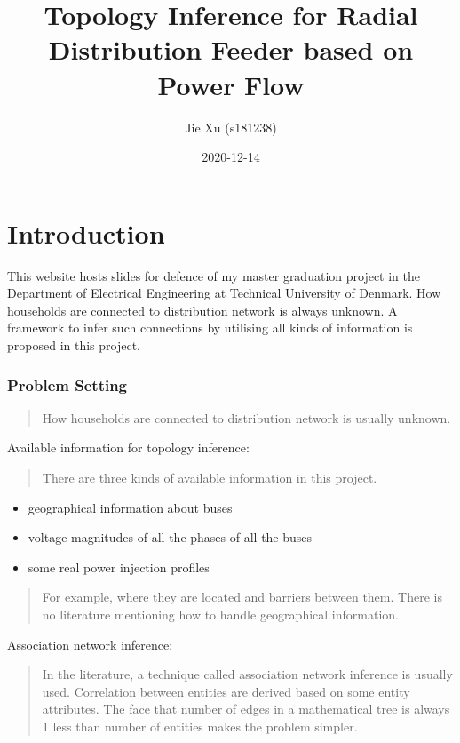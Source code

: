 \documentclass[
]{book}
\title{Topology Inference for Radial Distribution Feeder based on Power Flow}
\author{Jie Xu (s181238)}
\date{2020-12-14}
\providecommand{\tightlist}{%
  \setlength{\itemsep}{0pt}\setlength{\parskip}{0pt}}
\begin{document}
\maketitle

{
\setcounter{tocdepth}{1}
\tableofcontents
}
\hypertarget{introduction}{%
\chapter{Introduction}\label{introduction}}

This website hosts slides for defence of my master graduation project in the
Department of Electrical Engineering at Technical University of Denmark. How
households are connected to distribution network is always unknown. A framework
to infer such connections by utilising all kinds of information is proposed in
this project.

\hypertarget{problem-setting}{%
\subsection*{Problem Setting}\label{problem-setting}}

\begin{quote}
How households are connected to distribution network is usually unknown.
\end{quote}

Available information for topology inference:

\begin{quote}
There are three kinds of available information in this project.
\end{quote}

\begin{itemize}
\tightlist
\item
  geographical information about buses
\item
  voltage magnitudes of all the phases of all the buses
\item
  some real power injection profiles
\end{itemize}

\begin{quote}
For example, where they are located and barriers between them.
There is no literature mentioning how to handle geographical information.
\end{quote}

Association network inference:

\begin{quote}
In the literature, a technique called association network inference is
usually used. Correlation between entities are derived based on some entity
attributes. The face that number of edges in a mathematical tree is always 1
less than number of entities makes the problem simpler.
\end{quote}
\end{document}

